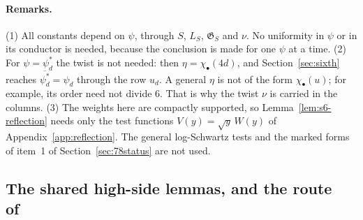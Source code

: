 \documentclass[11pt]{article}
\numberwithin{equation}{section}
\begin{document}
\paragraph{Remarks.} (1) All constants depend on $\psi$, through $S$, $L_S$, $\mathfrak G_S$ and $\nu$. No
uniformity in $\psi$ or in its conductor is needed, because the conclusion is made for one $\psi$ at a time.
(2) For $\psi=\psi_d^*$ the twist is not needed: then $\eta=\chi_\bullet(4d)$, and Section~\ref{sec:sixth}
reaches $\overline{\psi_d^*}=\psi_d$ through the row $u_d$. A general $\eta$ is not of the form
$\chi_\bullet(u)$; for example, its order need not divide $6$. That is why the twist $\nu$ is carried in the
columns. (3) The weights here are compactly supported, so Lemma~\ref{lem:s6-reflection} needs only the test
functions $V(y)=\sqrt y\,W(y)$ of Appendix~\ref{app:reflection}. The general log-Schwartz tests and the marked
forms of item~1 of Section~\ref{sec:78status} are not used.

\subsection{The shared high-side lemmas, and the route of~\texorpdfstring{\cite{OAI78}}{[OAI78]}}
\label{subsec:s6-shared}
\end{document}
